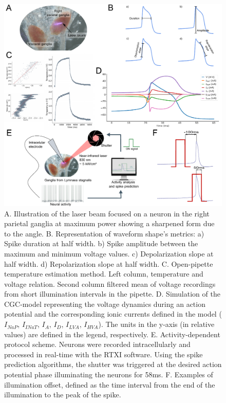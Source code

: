\begin{figure}[htb!]
    \centering
    \includegraphics[width=\textwidth]{img/laser/Fig1_methods_general_w_temperature_estimation.pdf}
    \caption{A. Illustration of the laser beam focused on a neuron in the right parietal ganglia at maximum power showing a sharpened form due to the angle. B. Representation of waveform shape's metrics: a) Spike duration at half width. b) Spike amplitude between the maximum and minimum voltage values. c) Depolarization slope at half width. d) Repolarization slope at half width. C. Open-pipette temperature estimation method. Left column, temperature and voltage relation. Second column filtered mean of voltage recordings from short illumination intervals in the pipette. D. Simulation of the CGC-model representing the voltage dynamics during an action potential and the corresponding ionic currents defined in the model ($I_{NaP}$, $I_{INaT}$, $I_A$, $I_D$, $I_{LVA}$, $I_{HVA}$). The units in the y-axis (in relative values) are defined in the legend, respectively. E. Activity-dependent protocol scheme. Neurons were recorded intracellularly and processed in real-time with the RTXI software. Using the spike prediction algorithms, the shutter was triggered at the desired action potential phase illuminating the neurons for 58ms. F. Examples of illumination offset, defined as the time interval from the end of the illumination to the peak of the spike.}
    \label{fig:methods_general}
\end{figure}

